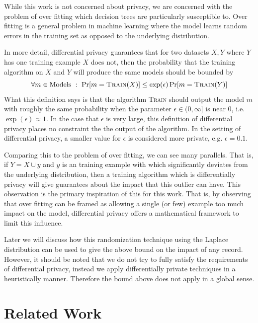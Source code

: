 \documentclass{article} %
\begin{document}
While this work is not concerned about privacy, we are concerned with the problem of over fitting which decision trees are particularly susceptible to. Over fitting is a general problem in machine learning where the model learns random errors in the training set as opposed to the underlying distribution. 

In more detail, differential privacy guarantees that for two datasets $X,Y$ where $Y$ has one training example $X$ does not, then the probability that the training algorithm on $X$ and $Y$ will produce the same models should be bounded by
$$
	\forall m \in\mbox{Models} \ : \ \Pr[m = \textsc{Train}(X)] \leq \exp(\epsilon) \Pr[m= \textsc{Train}(Y)]
$$
What this definition says is that the algorithm \textsc{Train} should output the model $m$ with roughly the same probability when the parameter $\epsilon\in (0,\infty]$ is near $0$, i.e. $\exp(\epsilon)\approx 1$. In the case that $\epsilon$ is very large, this definition of differential privacy places no constraint the the output of the algorithm. In the setting of differential privacy, a smaller value for $\epsilon$ is considered more private, e.g. $\epsilon=0.1$. 

Comparing this to the problem of over fitting, we can see many parallels. That is, if $Y = X \cup {y}$ and $y$ is an training example with which significantly deviates from the underlying distribution, then a training algorithm which is differentially privacy will give guarantees about the impact that this outlier can have. This observation is the primary inspiration of this for this work. That is, by observing that over fitting can be framed as allowing a single (or few) example too much impact on the model, differential privacy offers a mathematical framework to limit this influence. 

Later we will discuss how this randomization technique using the Laplace distribution can be used to give the above bound on the impact of any record. However, it should be noted that we do not try to fully satisfy the requirements of differential privacy, instead we apply differentially private techniques in a heuristically manner. Therefore the bound above does not apply in a global sense.

\section{Related Work}    
 
\end{document}
